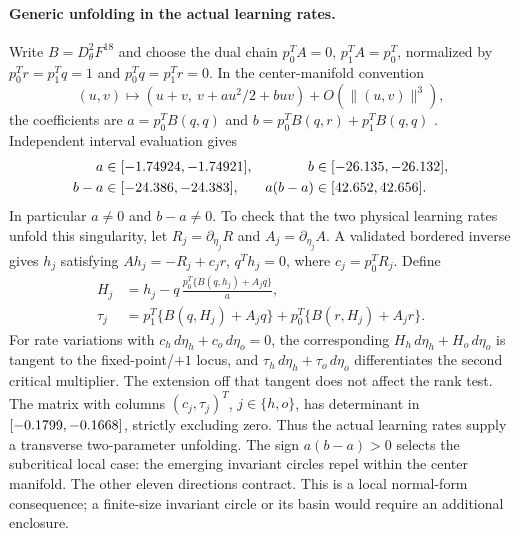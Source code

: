 \documentclass[11pt,letterpaper]{article}
\begin{document}
\paragraph{Generic unfolding in the actual learning rates.}
Write $B=D_\theta^2F^{18}$ and choose the dual chain
$p_0^T A=0$, $p_1^T A=p_0^T$, normalized by
$p_0^Tr=p_1^Tq=1$ and $p_0^Tq=p_1^Tr=0$.
In the center-manifold convention
\begin{equation}
(u,v)\longmapsto (u+v,\ v+a u^2/2+buv)+O(\|(u,v)\|^3),
\end{equation}
the coefficients are $a=p_0^TB(q,q)$ and
$b=p_0^TB(q,r)+p_1^TB(q,q)$ \citep[Section~4.4]{kuznetsovmeijer2005}.
Independent interval evaluation gives
\begin{equation}
\begin{aligned}
a&\in[-1.74924, -1.74921],& b&\in[-26.135, -26.132],\\
b-a&\in[-24.386, -24.383],&a(b-a)&\in[42.652, 42.656].
\end{aligned}
\end{equation}
In particular $a\ne0$ and $b-a\ne0$. To check that the two physical learning
rates unfold this singularity, let $R_j=\partial_{\eta_j}R$ and
$A_j=\partial_{\eta_j}A$. A validated bordered inverse gives $h_j$ satisfying
$Ah_j=-R_j+c_jr$, $q^Th_j=0$, where $c_j=p_0^TR_j$.
Define
\begin{equation}
\begin{aligned}
H_j&=h_j-q\,\frac{p_0^T\{B(q,h_j)+A_jq\}}{a},\\
\tau_j&=p_1^T\{B(q,H_j)+A_jq\}+p_0^T\{B(r,H_j)+A_jr\}.
\end{aligned}
\end{equation}
For rate variations with $c_h\,d\eta_h+c_o\,d\eta_o=0$, the corresponding
$H_h\,d\eta_h+H_o\,d\eta_o$ is tangent to the fixed-point/$+1$ locus,
and $\tau_h\,d\eta_h+\tau_o\,d\eta_o$ differentiates the second critical multiplier.
The extension off that tangent does not affect the rank test.
The matrix with columns $(c_j,\tau_j)^T$, $j\in\{h,o\}$, has determinant
in $[-0.1799, -0.1668]$, strictly excluding zero. Thus the actual learning
rates supply a transverse two-parameter unfolding. The sign $a(b-a)>0$
selects the subcritical local case: the emerging invariant circles repel
within the center manifold. The other eleven directions contract.
This is a local normal-form consequence; a finite-size invariant circle or its
basin would require an additional enclosure.
\end{document}
